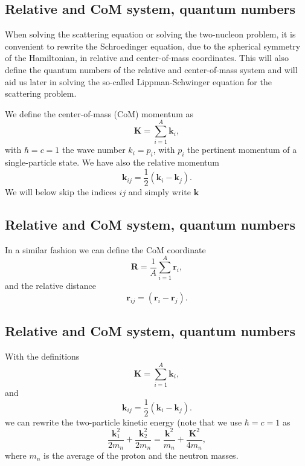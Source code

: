 \documentclass[%
twoside,                 %
final,                   %
10pt]{article}
\begin{document}
\subsection{Relative and CoM system, quantum numbers}
\begin{block}{}

When solving the scattering equation or solving the two-nucleon problem, it is convenient to rewrite the Schroedinger equation, due to
the spherical symmetry of the Hamiltonian, in relative and center-of-mass coordinates. This will also define the quantum numbers of the relative and center-of-mass system and will aid us later in solving
the so-called Lippman-Schwinger equation for the scattering problem. 

We define the center-of-mass (CoM)  momentum as
 \[
    \mathbf{K}=\sum_{i=1}^A\mathbf{k}_i,
 \]
with $\hbar=c=1$ the wave number $k_i=p_i$, with $p_i$ the pertinent momentum of a single-particle state. 
We have also the relative momentum
\[
    \mathbf{k}_{ij}=\frac{1}{2}(\mathbf{k}_i-\mathbf{k}_j).
 \]
We will below skip the indices $ij$ and simply write $\mathbf{k}$
\end{block}

\subsection{Relative and CoM system, quantum numbers}
\begin{block}{}

In a similar fashion we can define the CoM coordinate
 \[
     \mathbf{R}=\frac{1}{A}\sum_{i=1}^{A}\mathbf{r}_i,
 \]
 and the relative distance 
\[
    \mathbf{r}_{ij}=(\mathbf{r}_i-\mathbf{r}_j).
 \]
\end{block}

\subsection{Relative and CoM system, quantum numbers}
\begin{block}{}
With the definitions
 \[
    \mathbf{K}=\sum_{i=1}^A\mathbf{k}_i,
 \]
and
\[
    \mathbf{k}_{ij}=\frac{1}{2}(\mathbf{k}_i-\mathbf{k}_j).
 \]
we can rewrite the two-particle kinetic energy (note that we use $\hbar=c=1$ as 
\[
\frac{\mathbf{k}_1^2}{2m_n}+\frac{\mathbf{k}_2^2}{2m_n}=\frac{\mathbf{k}^2}{m_n}+\frac{\mathbf{K}^2}{4m_n},
\]
where $m_n$ is the average of the proton and the neutron masses. 
\end{block}
\end{document}
